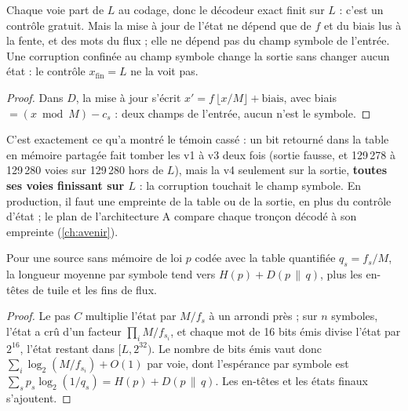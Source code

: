 \begin{lemme}\label{lem:etat-table}
Chaque voie part de $L$ au codage, donc le décodeur exact finit sur $L$ : c'est un contrôle gratuit. Mais la mise à jour de l'état ne dépend que de $f$ et du biais lus à la fente, et des mots du flux ; elle ne dépend pas du champ symbole de l'entrée. Une corruption confinée au champ symbole change la sortie sans changer aucun état : le contrôle $x_{\mathrm{fin}} = L$ ne la voit pas.
\end{lemme}

\begin{proof}
Dans $D$, la mise à jour s'écrit $x' = f\,\lfloor x/M\rfloor + \text{biais}$, avec biais $= (x \bmod M) - c_s$ : deux champs de l'entrée, aucun n'est le symbole.
\end{proof}

C'est exactement ce qu'a montré le témoin cassé : un bit retourné dans la table en mémoire partagée fait tomber les v1 à v3 deux fois (sortie fausse, et 129\,278 à 129\,280 voies sur 129\,280 hors de $L$), mais la v4 seulement sur la sortie, \textbf{toutes ses voies finissant sur $L$} \mes : la corruption touchait le champ symbole. En production, il faut une empreinte de la table ou de la sortie, en plus du contrôle d'état ; le plan de l'architecture A compare chaque tronçon décodé à son empreinte (\cref{ch:avenir}).

\begin{proposition}\label{prop:rans-longueur}
Pour une source sans mémoire de loi $p$ codée avec la table quantifiée $q_s = f_s/M$, la longueur moyenne par symbole tend vers $H(p) + D(p \,\|\, q)$, plus les en-têtes de tuile et les fins de flux.
\end{proposition}

\begin{proof}
Le pas $C$ multiplie l'état par $M/f_s$ à un arrondi près ; sur $n$ symboles, l'état a crû d'un facteur $\prod_i M/f_{s_i}$, et chaque mot de 16 bits émis divise l'état par $2^{16}$, l'état restant dans $[L, 2^{32})$. Le nombre de bits émis vaut donc $\sum_i \log_2(M/f_{s_i}) + O(1)$ par voie, dont l'espérance par symbole est $\sum_s p_s \log_2(1/q_s) = H(p) + D(p\,\|\,q)$. Les en-têtes et les états finaux s'ajoutent.
\end{proof}

